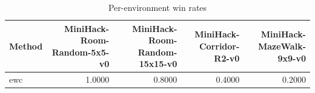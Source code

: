 \begin{table}[htbp]
\centering
\caption{Per-environment win rates}
\label{tab:per-env}
\begin{tabular}{lrrrr}
\toprule
\textbf{Method} & \textbf{MiniHack-Room-Random-5x5-v0} & \textbf{MiniHack-Room-Random-15x15-v0} & \textbf{MiniHack-Corridor-R2-v0} & \textbf{MiniHack-MazeWalk-9x9-v0} \\
\midrule
ewc & 1.0000 & 0.8000 & 0.4000 & 0.2000 \\
\bottomrule
\end{tabular}
\end{table}